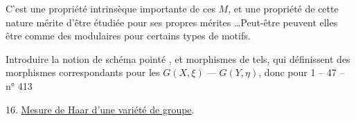C'est une propriété intrinsèque importante de
ces $M$, et une propriété de cette
nature mérite d'être étudiée pour ses
propres mérites \ldots Peut-être peuvent elles
 être  comme des 
modulaires pour certains types de
motifs.


Introduire la notion de schéma  pointé
, et
morphismes de tels, qui définissent des
morphismes correspondants pour les
$G(X,\xi)\mathrel{\text{---}}G(Y,\eta)$, donc pour
1 -- 47 -- \hfill n° 413

16. \uline{Mesure de Haar d'une variété de groupe}.

